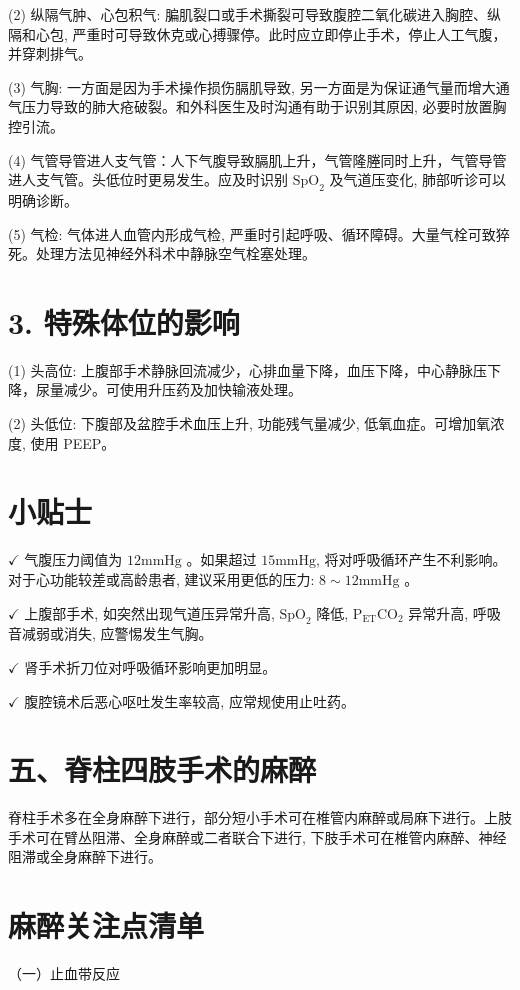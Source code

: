 \documentclass[10pt]{article}
\begin{document}
(2) 纵隔气肿、心包积气: 䐔肌裂口或手术撕裂可导致腹腔二氧化碳进入胸腔、纵隔和心包, 严重时可导致休克或心搏骤停。此时应立即停止手术，停止人工气腹，并穿刺排气。

(3) 气胸: 一方面是因为手术操作损伤膈肌导致, 另一方面是为保证通气量而增大通气压力导致的肺大疮破裂。和外科医生及时沟通有助于识别其原因, 必要时放置胸控引流。

(4) 气管导管进人支气管：人下气腹导致膈肌上升，气管隆塍同时上升，气管导管进人支气管。头低位时更易发生。应及时识别 $\mathrm{SpO}_{2}$ 及气道压变化, 肺部听诊可以明确诊断。

(5) 气检: 气体进人血管内形成气检, 严重时引起呼吸、循环障碍。大量气栓可致猝死。处理方法见神经外科术中静脉空气栓塞处理。

\section*{3. 特殊体位的影响}
(1) 头高位: 上腹部手术静脉回流减少，心排血量下降，血压下降，中心静脉压下降，尿量减少。可使用升压药及加快输液处理。

(2) 头低位: 下腹部及盆腔手术血压上升, 功能残气量减少, 低氧血症。可增加氧浓度, 使用 PEEP。

\section*{小贴士}
$\checkmark$ 气腹压力阈值为 $12 \mathrm{mmHg}$ 。如果超过 $15 \mathrm{mmHg}$, 将对呼吸循环产生不利影响。对于心功能较差或高龄患者, 建议采用更低的压力: $8 \sim 12 \mathrm{mmHg}$ 。

$\checkmark$ 上腹部手术, 如突然出现气道压异常升高, $\mathrm{SpO}_{2}$ 降低, $\mathrm{P}_{\mathrm{ET}} \mathrm{CO}_{2}$ 异常升高, 呼吸音减弱或消失, 应警惕发生气胸。

$\checkmark$ 肾手术折刀位对呼吸循环影响更加明显。

$\checkmark$ 腹腔镜术后恶心呕吐发生率较高, 应常规使用止吐药。

\section*{五、脊柱四肢手术的麻醉}
脊柱手术多在全身麻醉下进行，部分短小手术可在椎管内麻醉或局麻下进行。上肢手术可在臂丛阻滞、全身麻醉或二者联合下进行, 下肢手术可在椎管内麻醉、神经阻滞或全身麻醉下进行。

\section*{麻醉关注点清单}
（一）止血带反应
\end{document}
